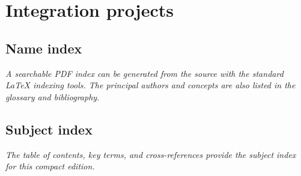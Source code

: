 \documentclass[11pt,oneside]{book}
\begin{document}
\part{Integration projects}



\appendix





\backmatter


\chapter*{Name index}
\noindent\textit{A searchable PDF index can be generated from the source with the standard LaTeX indexing tools. The principal authors and concepts are also listed in the glossary and bibliography.}
\chapter*{Subject index}
\noindent\textit{The table of contents, key terms, and cross-references provide the subject index for this compact edition.}
\end{document}
